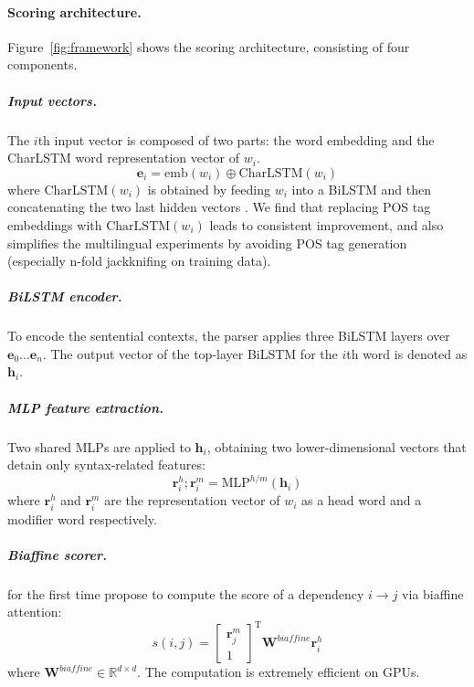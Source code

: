 \documentclass[11pt,a4paper]{article}
\begin{document}
\paragraph{Scoring architecture.}
Figure~\ref{fig:framework} shows the scoring architecture, consisting of four components.









\subparagraph{Input vectors.}
The $i$th input vector is composed of two parts:
the word embedding and the CharLSTM word representation vector of $w_i$.
\begin{equation}
\label{equation:input}
\mathbf{e}_i=\mathrm{emb}({w_i}) \oplus \mathrm{CharLSTM}(w_i)
\end{equation}
where $\mathrm{CharLSTM}(w_i)$ is obtained by feeding $w_i$ into a BiLSTM and
then concatenating the two last hidden vectors \cite{lample-etal-2016-neural}.
We find that replacing POS tag embeddings with  $\mathrm{CharLSTM}(w_i)$ leads to consistent improvement,
and also simplifies the multilingual experiments by avoiding POS tag generation (especially n-fold jackknifing on training data).




\subparagraph{BiLSTM encoder.} To encode the sentential contexts,
the parser applies three BiLSTM layers over $\mathbf{e}_0 \dots \mathbf{e}_n$. The output vector of the top-layer BiLSTM for the $i$th word
is denoted as $\mathbf{h}_i$.


\subparagraph{MLP feature extraction.} Two shared MLPs are applied to $\mathbf{h}_i$, obtaining
two lower-dimensional vectors that detain only syntax-related features:
\begin{equation}
\label{mlp-arc}
\mathbf{r}_i^{h}; \mathbf{r}_i^{m} =\mathrm{MLP}^{h/m} \left( \mathbf{h}_i \right)
\end{equation}
where $\mathbf{r}_i^{h}$ and $\mathbf{r}_i^{m}$ are the representation vector of $w_i$ as a head word and a modifier word respectively.


\subparagraph{Biaffine scorer.}
\citet{Timothy-d17-biaffine} for the first time propose to compute the score of a dependency $i \rightarrow j$ via biaffine attention:
\begin{equation} \label{equation:biaffine}
s(i,j) =  \left[
\begin{array}{c}
  \mathbf{r}_{j}^{m}    \\
    1
\end{array}
\right]^\mathrm{T}
\mathbf{W}^\textit{biaffine}  \mathbf{r}_{i}^{h}
\end{equation}
where $\mathbf{W}^\textit{biaffine} \in \mathbb{R}^{d \times d}$.
The computation is extremely efficient on GPUs.
\end{document}

